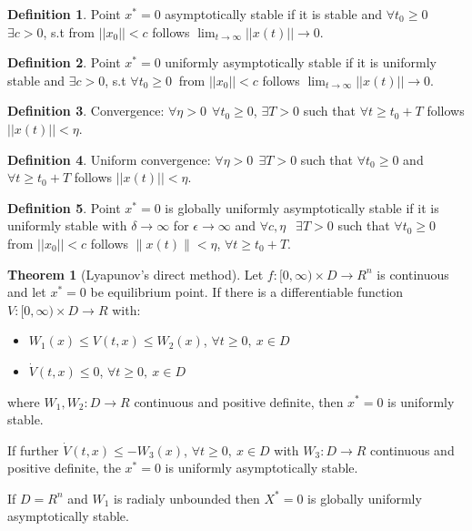 \documentclass[10pt,landscape]{article}
\theoremstyle{definition}
\newtheorem{Theorem}{Theorem}[section]
\newtheorem*{Definition}{Definition}
\begin{document}
\begin{multicols}{4}
\begin{Definition}
 Point $x^*=0$ asymptotically stable if it is stable and $\forall t_0 \ge 0\ $  
 $\exists c>0$, s.t from $||x_0||<c$
 follows $\lim_{t\to \infty} ||x(t)|| \to 0$.
\end{Definition}

\begin{Definition}
 Point $x^*=0$ uniformly asymptotically stable if it is uniformly stable and 
 $\exists c>0$, s.t $\forall t_0 \ge 0\ $ from $||x_0||<c$
 follows $\lim_{t\to \infty} ||x(t)|| \to 0$.
\end{Definition}


\begin{Definition}
 Convergence: $\forall \eta > 0 \ \ \forall t_0 \ge 0$, $\exists T>0$ such
 that $\forall t \ge t_0+T$ follows $||x(t)||<\eta$.
\end{Definition}

\begin{Definition}
 Uniform convergence: $\forall \eta > 0 \ \ \exists T>0$ such
 that $\forall t_0 \ge 0$ and $\forall t \ge t_0+T$ follows $||x(t)||<\eta$.
\end{Definition}

\begin{Definition}
 Point $x^*=0$ is globally uniformly asymptotically stable if it is uniformly stable
 with $\delta \to \infty$ for $\epsilon \to \infty$ and $\forall c,\eta\ \ $ 
 $\exists T>0$ such that $\forall t_0\ge0$ from $||x_0||<c$ follows 
 $\|x(t)\|<\eta$, $\forall t \ge t_0 + T$.
\end{Definition}

\begin{Theorem}[Lyapunov's direct method]
 Let $f:[0,\infty)\times D\to R^n$ is continuous and let $x^*=0$ be equilibrium point.
 If there is a differentiable function $V:[0,\infty)\times D\to R$ with:
 \begin{itemize}
  \item $W_1(x) \le V(t,x) \le W_2(x)$, $\forall t\ge0,\ x\in D$
  \item $\dot V(t,x)\le 0$, $\forall t \ge0,\ x\in D$
 \end{itemize}
 where $W_1,W_2:D \to R$ continuous and positive definite, then $x^*=0$ is uniformly stable.

 If further $\dot V(t,x) \le -W_3(x)$, $\forall t\ge0,\ x\in D$ with $W_3:D \to R$
 continuous and positive definite, the $x^*=0$ is uniformly asymptotically stable.

 If $D=R^n$ and $W_1$ is radialy unbounded then $X^*=0$ is globally uniformly
 asymptotically stable.
\end{Theorem}


\end{multicols}
\end{document}
